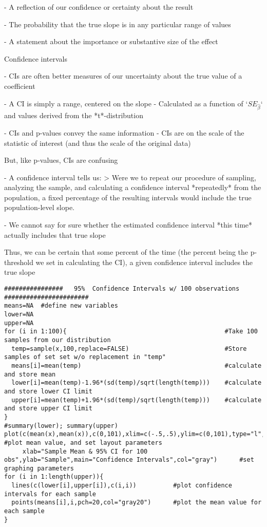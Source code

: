 \documentclass[a4paper,12pt]{article}
\begin{document}
\begin{enumerate*}
  - A reflection of our confidence or certainty about the result

  - The probability that the true slope is in any particular range of values

  - A statement about the importance or substantive size of the effect
  
  
  Confidence intervals
  
    - CIs are often better measures of our uncertainty about the true value of a coefficient
    
    - A CI is simply a range, centered on the slope
      - Calculated as a function of `\(SE_{\hat{\beta}}\)` and values derived from the *t*-distribution
  
    - CIs and p-values convey the same information
      - CIs are on the scale of the statistic of interest (and thus the scale of the original data)
      
      
      
      But, like p-values, CIs are confusing
      
        - A confidence interval tells us:
        > Were we to repeat our procedure of sampling, analyzing the sample, and calculating a confidence interval *repeatedly* from the population, a fixed percentage of the resulting intervals would include the true population-level slope.
        
        - We cannot say for sure whether the estimated confidence interval *this time* actually includes that true slope
        
        
        Thus, we can be certain that some percent of the time (the percent being the p-threshold we set in calculating the CI), a given confidence interval includes the true slope
        







\begin{verbatim}
################   95%  Confidence Intervals w/ 100 observations #######################
means=NA  #define new variables
lower=NA  
upper=NA                       
for (i in 1:100){                                           #Take 100 samples from our distribution
  temp=sample(x,100,replace=FALSE)                          #Store samples of set set w/o replacement in "temp"
  means[i]=mean(temp)                                       #calculate and store mean
  lower[i]=mean(temp)-1.96*(sd(temp)/sqrt(length(temp)))    #calculate and store lower CI limit
  upper[i]=mean(temp)+1.96*(sd(temp)/sqrt(length(temp)))    #calculate and store upper CI limit
}
#summary(lower); summary(upper)
plot(c(mean(x),mean(x)),c(0,101),xlim=c(-.5,.5),ylim=c(0,101),type="l",      #plot mean value, and set layout parameters
     xlab="Sample Mean & 95% CI for 100 obs",ylab="Sample",main="Confidence Intervals",col="gray")      #set graphing parameters
for (i in 1:length(upper)){                   
  lines(c(lower[i],upper[i]),c(i,i))          #plot confidence intervals for each sample
  points(means[i],i,pch=20,col="gray20")      #plot the mean value for each sample
}


\end{verbatim}
\end{enumerate*}
\end{document}
